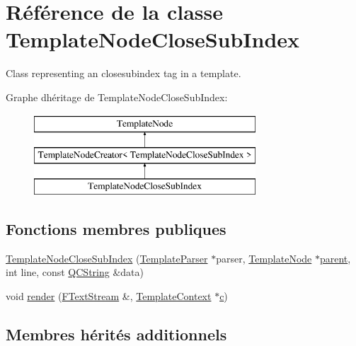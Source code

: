 \hypertarget{class_template_node_close_sub_index}{}\section{Référence de la classe Template\+Node\+Close\+Sub\+Index}
\label{class_template_node_close_sub_index}


Class representing an \textquotesingle{}closesubindex\textquotesingle{} tag in a template.  


Graphe d\textquotesingle{}héritage de Template\+Node\+Close\+Sub\+Index\+:\begin{figure}[H]
\begin{center}
\leavevmode
\includegraphics[height=3.000000cm]{class_template_node_close_sub_index}
\end{center}
\end{figure}
\subsection*{Fonctions membres publiques}
\begin{DoxyCompactItemize}
\item 
\hyperlink{class_template_node_close_sub_index_adf85c2143ec427e31acf1918455a8036}{Template\+Node\+Close\+Sub\+Index} (\hyperlink{class_template_parser}{Template\+Parser} $\ast$parser, \hyperlink{class_template_node}{Template\+Node} $\ast$\hyperlink{class_template_node_a69a306ef84e62af9fe57bf9aacc94536}{parent}, int line, const \hyperlink{class_q_c_string}{Q\+C\+String} \&data)
\item 
void \hyperlink{class_template_node_close_sub_index_aa13bc08e74c79a40b5b9ed3f0de813be}{render} (\hyperlink{class_f_text_stream}{F\+Text\+Stream} \&, \hyperlink{class_template_context}{Template\+Context} $\ast$\hyperlink{060__command__switch_8tcl_ab14f56bc3bd7680490ece4ad7815465f}{c})
\end{DoxyCompactItemize}
\subsection*{Membres hérités additionnels}


